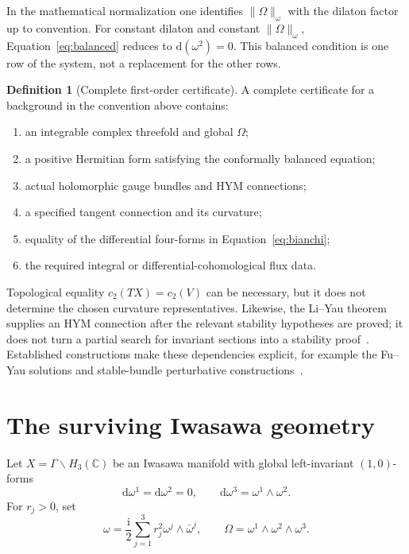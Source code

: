 \documentclass[11pt]{article}
\newcommand{\ii}{\mathrm{i}}
\newcommand{\dd}{\mathrm{d}}
\newcommand{\C}{\mathbb{C}}
\theoremstyle{definition}
\newtheorem{definition}[theorem]{Definition}
\theoremstyle{remark}
\begin{document}
In the mathematical normalization one identifies
\(\|\Omega\|_\omega\) with the dilaton factor up to convention.  For constant
dilaton and constant \(\|\Omega\|_\omega\),
Equation~\eqref{eq:balanced} reduces to \(\dd(\omega^2)=0\).  This balanced
condition is one row of the system, not a replacement for the other rows.

\begin{definition}[Complete first-order certificate]
A complete certificate for a background in the convention above contains:
\begin{enumerate}[label=\textup{(\roman*)},leftmargin=2.1em]
\item an integrable complex threefold and global \(\Omega\);
\item a positive Hermitian form satisfying the conformally balanced equation;
\item actual holomorphic gauge bundles and HYM connections;
\item a specified tangent connection and its curvature;
\item equality of the differential four-forms in
      Equation~\eqref{eq:bianchi};
\item the required integral or differential-cohomological flux data.
\end{enumerate}
\end{definition}

Topological equality
\(c_2(TX)=c_2(V)\) can be necessary, but it does not determine the chosen
curvature representatives.  Likewise, the Li--Yau theorem supplies an HYM
connection after the relevant stability hypotheses are proved; it does not
turn a partial search for invariant sections into a stability
proof~\cite{LiYau1987}.  Established constructions make these dependencies
explicit, for example the Fu--Yau solutions and stable-bundle perturbative
constructions~\cite{FuYau2008,AndreasGarciaFernandez2012}.

\section{The surviving Iwasawa geometry}
\label{sec:iwasawa}

Let \(X=\Gamma\backslash H_3(\C)\) be an Iwasawa manifold with global
left-invariant \((1,0)\)-forms
\begin{equation}
\dd\omega^1=\dd\omega^2=0,\qquad
\dd\omega^3=\omega^1\wedge\omega^2.
\label{eq:iwasawa}
\end{equation}
For \(r_j>0\), set
\begin{equation}
\omega=\frac{\ii}{2}\sum_{j=1}^3 r_j^2
\omega^j\wedge\bar\omega^j,\qquad
\Omega=\omega^1\wedge\omega^2\wedge\omega^3.
\label{eq:su3}
\end{equation}
\end{document}
